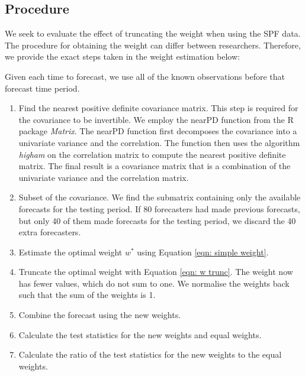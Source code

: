 \documentclass[11pt]{article}
\begin{document}
	\subsection{Procedure}\label{procedure}
	
	We seek to evaluate the effect of truncating the weight when using the SPF data. The procedure for obtaining the weight can differ between researchers. Therefore, we provide the exact steps taken in the weight estimation below:
	
	
	Given each time to forecast, we use all of the known observations before that forecast time period.
	
	\begin{enumerate}
		\def\labelenumi{\arabic{enumi}.}
		\item
		Find the nearest positive definite covariance matrix. This step is required for the covariance to be invertible. We employ the nearPD function from the R package \emph{Matrix}. The nearPD function first decomposes the covariance into a univariate variance and the correlation. The function then uses the algorithm \emph{higham} on the correlation matrix to compute the nearest positive definite matrix. The final result is a covariance matrix that is a combination of the univariate variance and the correlation matrix.
		\item
		Subset of the covariance. We find the submatrix containing only the available forecasts for the testing period. If 80 forecasters had made previous forecasts, but only 40 of them made forecasts for the testing period, we discard the 40 extra forecasters.
		\item
		Estimate the optimal weight \(w^*\) using Equation
		\ref{eqn: simple weight}.
		\item
		Truncate the optimal weight with Equation \ref{eqn: w trunc}. The weight now has fewer values, which do not sum to one. We normalise the weights back such that the sum of the weights is 1.
		\item
		Combine the forecast using the new weights.
		\item
		Calculate the test statistics for the new weights and equal weights.
		\item
		Calculate the ratio of the test statistics for the new weights to the equal weights.
	\end{enumerate}
	
\end{document}
